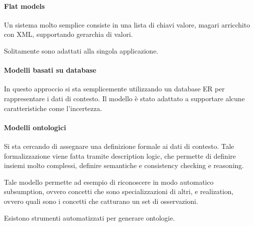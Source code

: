 \paragraph{Flat models}
Un sistema molto semplice consiste in una lista di chiavi valore, 
magari arricchito con XML, supportando gerarchia di valori.

Solitamente sono adattati alla singola applicazione.

\paragraph{Modelli basati su database}
In questo approccio si sta semplicemente utilizzando un database
ER per rappresentare i dati di contesto. Il modello è stato 
adattato a supportare alcune caratteristiche come l'incertezza.

\paragraph{Modelli ontologici}
Si sta cercando di assegnare una definizione formale ai dati di contesto.
Tale formalizzazione viene fatta tramite description logic, 
che permette di definire insiemi molto complessi, definire semantiche 
e consistency checking e reasoning.

Tale modello permette ad esempio di riconoscere in modo automatico 
subsumption, ovvero concetti che sono specializzazioni di altri, 
e realization, ovvero quali sono i concetti che catturano 
un set di osservazioni.

Esistono strumenti automatizzati per generare ontologie.
